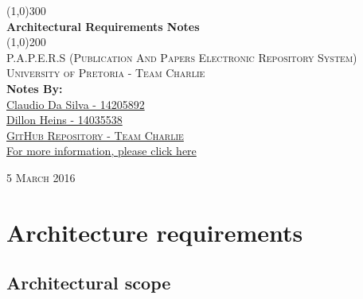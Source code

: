 \documentclass{article}
\begin{document}
	
	\begin{titlepage}
		\begin{center}
			
			\line(1,0){300}\\
			[6mm]
			\huge{
				\bfseries Architectural Requirements Notes
			}\\
			[2mm]
			\line(1,0){200}\\
			[15mm]
			\textsc{\large P.A.P.E.R.S (Publication And Papers Electronic Repository System)}\\
			[7.5mm]
			\textsc{\large University of Pretoria - Team Charlie}\\
			[20mm]
			\large{\textbf{Notes By:}}\\
			[2mm]
			\large{
				\href{https://github.com/ClaudioMDS}{Claudio Da Silva - 14205892}\\
				\href{https://github.com/DillonHeins}{Dillon Heins - 14035538}
			}\\
			[4cm]
			
			\href{https://github.com/DillonHeins/Charlie}{\textsc{\Large GitHub Repository - Team Charlie}\\[2mm]
				For more information, please click here}
			
		\end{center}	
		\begin{flushright}
			\textsc{\large 5 March 2016}
		\end{flushright}
	\end{titlepage}
	
	\cleardoublepage
	\thispagestyle{empty}
	\tableofcontents
	\cleardoublepage
	\setcounter{page}{1}
	\section{Architecture requirements}\label{sec:requirements}
	
	\subsection{Architectural scope}\label{subsec:scope}
	
\end{document}
